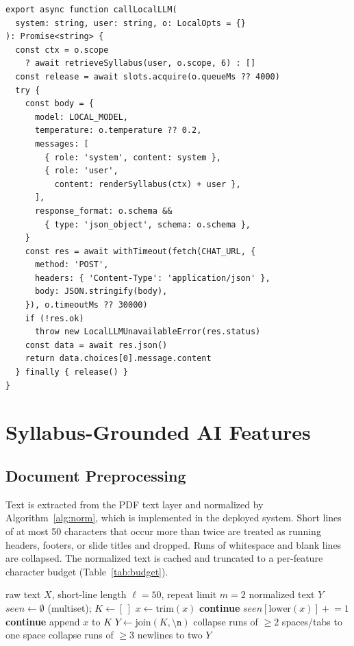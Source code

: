 \documentclass[conference]{IEEEtran}
\begin{document}
\begin{lstlisting}[caption={Proposed SLIE client (abridged). The signature matches the replaced cloud client, so each route handler changes by one import.},label={lst:client},float=t]
export async function callLocalLLM(
  system: string, user: string, o: LocalOpts = {}
): Promise<string> {
  const ctx = o.scope
    ? await retrieveSyllabus(user, o.scope, 6) : []
  const release = await slots.acquire(o.queueMs ?? 4000)
  try {
    const body = {
      model: LOCAL_MODEL,
      temperature: o.temperature ?? 0.2,
      messages: [
        { role: 'system', content: system },
        { role: 'user',
          content: renderSyllabus(ctx) + user },
      ],
      response_format: o.schema &&
        { type: 'json_object', schema: o.schema },
    }
    const res = await withTimeout(fetch(CHAT_URL, {
      method: 'POST',
      headers: { 'Content-Type': 'application/json' },
      body: JSON.stringify(body),
    }), o.timeoutMs ?? 30000)
    if (!res.ok)
      throw new LocalLLMUnavailableError(res.status)
    const data = await res.json()
    return data.choices[0].message.content
  } finally { release() }
}
\end{lstlisting}

\section{Syllabus-Grounded AI Features}
\label{sec:features}

\subsection{Document Preprocessing}
Text is extracted from the PDF text layer and normalized by
Algorithm~\ref{alg:norm}, which is implemented in the deployed system. Short
lines of at most 50 characters that occur more than twice are treated as
running headers, footers, or slide titles and dropped. Runs of whitespace and
blank lines are collapsed. The normalized text is cached and truncated to a
per-feature character budget (Table~\ref{tab:budget}).

\begin{algorithm}[t]
\caption{Prompt-Oriented Text Normalization}
\label{alg:norm}
\begin{algorithmic}[1]
\REQUIRE raw text $X$, short-line length $\ell{=}50$, repeat limit $m{=}2$
\ENSURE normalized text $Y$
\STATE $seen \leftarrow \emptyset$ (multiset); $K \leftarrow [\,]$
  \STATE $x \leftarrow \mathrm{trim}(x)$
   \STATE \textbf{continue} \ENDIF
    \STATE $seen[\mathrm{lower}(x)] \mathrel{+}= 1$
     \STATE \textbf{continue} \ENDIF
  \ENDIF
  \STATE append $x$ to $K$
\ENDFOR
\STATE $Y \leftarrow \mathrm{join}(K, \texttt{\textbackslash n})$
\STATE collapse runs of $\ge 2$ spaces/tabs to one space
\STATE collapse runs of $\ge 3$ newlines to two
\RETURN $Y$
\end{algorithmic}
\end{algorithm}
\end{document}
